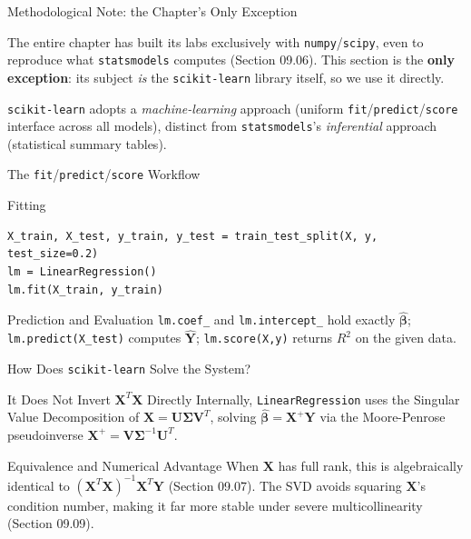 \documentclass[10pt, aspectratio=169]{beamer}
\begin{document}
\begin{frame}{Methodological Note: the Chapter's Only Exception}
  \footnotesize
  \begin{motivacion}
    The entire chapter has built its labs exclusively with \texttt{numpy}/\texttt{scipy}, even to reproduce what \texttt{statsmodels} computes (Section 09.06). This section is the \textbf{only exception}: its subject \emph{is} the \texttt{scikit-learn} library itself, so we use it directly.
  \end{motivacion}

  \vspace{0.15cm}
  \pause
  \texttt{scikit-learn} adopts a \emph{machine-learning} approach (uniform \texttt{fit}/\texttt{predict}/\texttt{score} interface across all models), distinct from \texttt{statsmodels}'s \emph{inferential} approach (statistical summary tables).
\end{frame}

\begin{frame}[fragile]{The \texttt{fit}/\texttt{predict}/\texttt{score} Workflow}
  \footnotesize
  \begin{block}{Fitting}
    \begin{verbatim}
X_train, X_test, y_train, y_test = train_test_split(X, y, test_size=0.2)
lm = LinearRegression()
lm.fit(X_train, y_train)
    \end{verbatim}
  \end{block}
  \pause

  \vspace{0.1cm}
  \begin{alertblock}{Prediction and Evaluation}
    \texttt{lm.coef\_} and \texttt{lm.intercept\_} hold exactly $\hat{\boldsymbol\beta}$; \texttt{lm.predict(X\_test)} computes $\hat{\mathbf{Y}}$; \texttt{lm.score(X,y)} returns $R^2$ on the given data.
  \end{alertblock}
\end{frame}

\begin{frame}{How Does \texttt{scikit-learn} Solve the System?}
  \footnotesize
  \begin{block}{It Does Not Invert $\mathbf{X}^T\mathbf{X}$ Directly}
    Internally, \texttt{LinearRegression} uses the Singular Value Decomposition of $\mathbf{X}=\mathbf{U}\boldsymbol\Sigma\mathbf{V}^T$, solving $\hat{\boldsymbol\beta}=\mathbf{X}^+\mathbf{Y}$ via the Moore-Penrose pseudoinverse $\mathbf{X}^+=\mathbf{V}\boldsymbol\Sigma^{-1}\mathbf{U}^T$.
  \end{block}
  \pause

  \vspace{0.1cm}
  \begin{alertblock}{Equivalence and Numerical Advantage}
    When $\mathbf{X}$ has full rank, this is algebraically identical to $(\mathbf{X}^T\mathbf{X})^{-1}\mathbf{X}^T\mathbf{Y}$ (Section 09.07). The SVD avoids squaring $\mathbf{X}$'s condition number, making it far more stable under severe multicollinearity (Section 09.09).
  \end{alertblock}
\end{frame}
\end{document}
